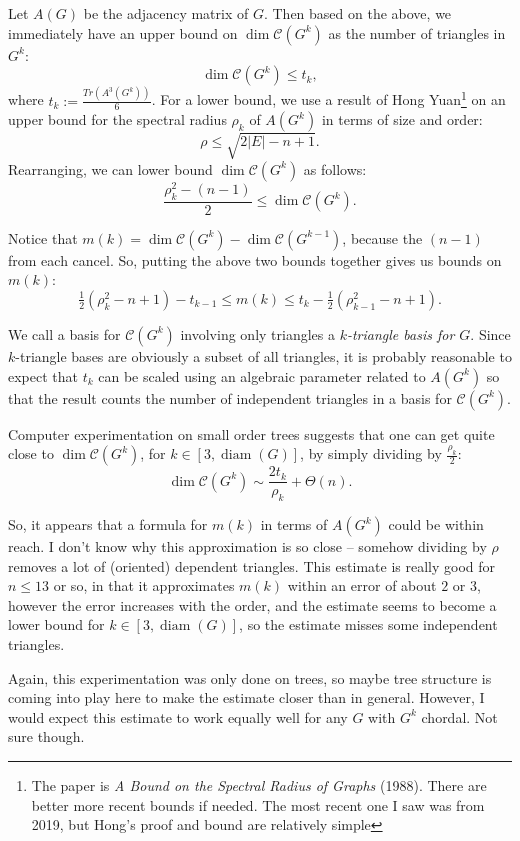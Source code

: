 \documentclass[12pt]{article}
\DeclareMathOperator{\diam}{diam}
\theoremstyle{definition}
\begin{document}
Let $A(G)$ be the adjacency matrix of $G$.  Then based on the above, we immediately have an upper bound on $\dim\mathcal{C}(G^k)$ as the number of triangles in $G^k$:  
$$\dim\mathcal{C}(G^k) \leq t_k,$$
where $t_k := \tfrac{Tr(A^3(G^k))}{6}$.  For a lower bound, we use a result of Hong Yuan\footnote{The paper is \textit{A Bound on the Spectral Radius of Graphs} (1988).  There are better more recent bounds if needed.  The most recent one I saw was from 2019, but Hong's proof and bound are relatively simple} on an upper bound for the spectral radius $\rho_k$ of $A(G^k)$ in terms of size and order:
$$\rho \leq \sqrt{2|E| - n + 1}.$$  
Rearranging, we can lower bound $\dim\mathcal{C}(G^k)$ as follows:
$$\frac{\rho_k^2 - (n-1)}{2} \leq \dim \mathcal{C}(G^k).$$

Notice that $m(k) = \dim \mathcal{C}(G^k) - \dim \mathcal{C}(G^{k-1})$, because the $(n-1)$ from each cancel.  So, putting the above two bounds together gives us bounds on $m(k)$:
$$\tfrac{1}{2}(\rho_k^2 - n+1)- t_{k-1} \leq m(k) \leq t_k - \tfrac{1}{2}(\rho_{k-1}^2 - n+1).$$

We call a basis for $\mathcal{C}(G^k)$ involving only triangles a \emph{$k$-triangle basis for $G$}.  Since $k$-triangle bases are obviously a subset of all triangles, it is probably reasonable to expect that $t_k$ can be scaled using an algebraic parameter related to $A(G^k)$ so that the result counts the number of independent triangles in a basis for $\mathcal{C}(G^k)$.  

Computer experimentation on small order trees suggests that one can get quite close to $\dim \mathcal{C}(G^k)$, for $k \in [3,\diam(G)]$, by simply dividing by $\tfrac{\rho_k}{2}$:
$$\dim \mathcal{C}(G^k) \sim \frac{2t_k}{\rho_k} + \Theta(n).$$

So, it appears that a formula for $m(k)$ in terms of $A(G^k)$ could be within reach.  I don't know why this approximation is so close -- somehow dividing by $\rho$ removes a lot of (oriented) dependent triangles.  This estimate is really good for $n \leq 13$ or so, in that it approximates $m(k)$ within an error of about $2$ or $3$, however the error increases with the order, and the estimate seems to become a lower bound for $k \in [3,\diam(G)]$, so the estimate misses some independent triangles.  

Again, this experimentation was only done on trees, so maybe tree structure is coming into play here to make the estimate closer than in general.  However, I would expect this estimate to work equally well for any $G$ with $G^k$ chordal.  Not sure though.
\end{document}
